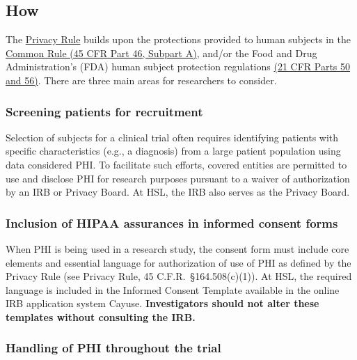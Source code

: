 \documentclass[]{book}
\theoremstyle{definition}
\theoremstyle{definition}
\theoremstyle{definition}
\theoremstyle{remark}
\begin{document}
\subsection{How}\label{how-6}

The \href{http://www.hhs.gov/hipaa/for-professionals/privacy/}{Privacy
Rule} builds upon the protections provided to human subjects in the
\href{http://www.hhs.gov/ohrp/regulations-and-policy/regulations/common-rule/}{Common
Rule (45 CFR Part 46, Subpart A)}, and/or the Food and Drug
Administration's (FDA) human subject protection regulations
\href{http://osp.od.nih.gov/office-clinical-research-and-bioethics-policy/clinical-research-policy/research-involving-human-subjects}{(21
CFR Parts 50 and 56)}. There are three main areas for researchers to
consider.

\subsubsection{Screening patients for
recruitment}\label{screening-patients-for-recruitment}

Selection of subjects for a clinical trial often requires identifying
patients with specific characteristics (e.g., a diagnosis) from a large
patient population using data considered PHI. To facilitate such
efforts, covered entities are permitted to use and disclose PHI for
research purposes pursuant to a waiver of authorization by an IRB or
Privacy Board. At HSL, the IRB also serves as the Privacy Board.

\subsubsection{Inclusion of HIPAA assurances in informed consent
forms}\label{inclusion-of-hipaa-assurances-in-informed-consent-forms}

When PHI is being used in a research study, the consent form must
include core elements and essential language for authorization of use of
PHI as defined by the Privacy Rule (see Privacy Rule, 45
C.F.R.~§164.508(c)(1)). At HSL, the required language is included in the
Informed Consent Template available in the online IRB application system
Cayuse. \textbf{Investigators should not alter these templates without
consulting the IRB.}

\subsubsection{Handling of PHI throughout the
trial}\label{handling-of-phi-throughout-the-trial}
\end{document}
